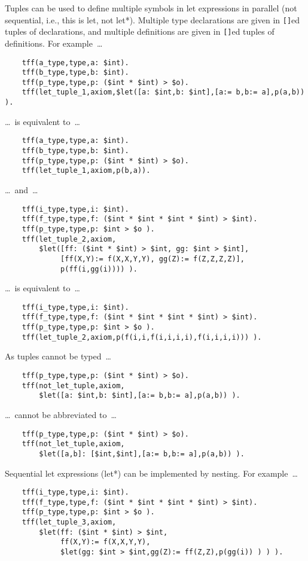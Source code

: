 \documentclass{easychair}
\begin{document}
Tuples can be used to define multiple symbols in let expressions in parallel 
(not sequential, i.e., this is let, not let*). 
Multiple type declarations are given in {\tt []}ed tuples of declarations, and 
multiple definitions are given in {\tt []}ed tuples of definitions. 
For example~\ldots
\begin{verbatim}
    tff(a_type,type,a: $int).
    tff(b_type,type,b: $int).
    tff(p_type,type,p: ($int * $int) > $o).
    tff(let_tuple_1,axiom,$let([a: $int,b: $int],[a:= b,b:= a],p(a,b)) ).
\end{verbatim}
\ldots~is equivalent to~\ldots
\begin{verbatim}
    tff(a_type,type,a: $int).
    tff(b_type,type,b: $int).
    tff(p_type,type,p: ($int * $int) > $o).
    tff(let_tuple_1,axiom,p(b,a)).
\end{verbatim}
\ldots~and~\ldots
\begin{verbatim}
    tff(i_type,type,i: $int).
    tff(f_type,type,f: ($int * $int * $int * $int) > $int).
    tff(p_type,type,p: $int > $o ).
    tff(let_tuple_2,axiom,
        $let([ff: ($int * $int) > $int, gg: $int > $int],
             [ff(X,Y):= f(X,X,Y,Y), gg(Z):= f(Z,Z,Z,Z)],
             p(ff(i,gg(i)))) ).
\end{verbatim}
\ldots~is equivalent to~\ldots
\begin{verbatim}
    tff(i_type,type,i: $int).
    tff(f_type,type,f: ($int * $int * $int * $int) > $int).
    tff(p_type,type,p: $int > $o ).
    tff(let_tuple_2,axiom,p(f(i,i,f(i,i,i,i),f(i,i,i,i))) ).
\end{verbatim}
As tuples cannot be typed~\ldots
\begin{verbatim}
    tff(p_type,type,p: ($int * $int) > $o).
    tff(not_let_tuple,axiom,
        $let([a: $int,b: $int],[a:= b,b:= a],p(a,b)) ).
\end{verbatim}
\ldots~cannot be abbreviated to~\ldots
\begin{verbatim}
    tff(p_type,type,p: ($int * $int) > $o).
    tff(not_let_tuple,axiom,
        $let([a,b]: [$int,$int],[a:= b,b:= a],p(a,b)) ).
\end{verbatim}
Sequential let expressions (let*) can be implemented by nesting. 
For example~\ldots
\begin{verbatim}
    tff(i_type,type,i: $int).
    tff(f_type,type,f: ($int * $int * $int * $int) > $int).
    tff(p_type,type,p: $int > $o ).
    tff(let_tuple_3,axiom,
        $let(ff: ($int * $int) > $int,
             ff(X,Y):= f(X,X,Y,Y),
             $let(gg: $int > $int,gg(Z):= ff(Z,Z),p(gg(i)) ) ) ).
\end{verbatim}
\end{document}
